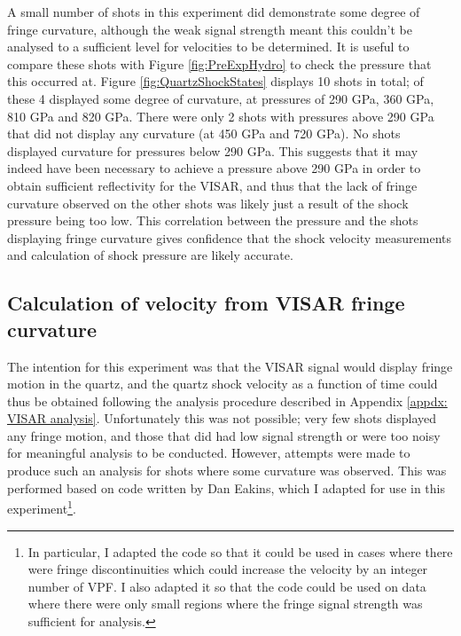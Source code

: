 A small number of shots in this experiment did demonstrate some degree of fringe curvature, although the weak signal strength meant this couldn't be analysed to a sufficient level for velocities to be determined. It is useful to compare these shots with Figure \ref{fig:PreExpHydro} to check the pressure that this occurred at. Figure \ref{fig:QuartzShockStates} displays 10 shots in total; of these 4 displayed some degree of curvature, at pressures of 290 \unit{\giga\pascal}, 360 \unit{\giga\pascal}, 810 \unit{\giga\pascal} and 820 \unit{\giga\pascal}. There were only 2 shots with pressures above 290 \unit{\giga\pascal} that did not display any curvature (at 450 \unit{\giga\pascal} and 720 \unit{\giga\pascal}). No shots displayed curvature for pressures below 290 \unit{\giga\pascal}. This suggests that it may indeed have been necessary to achieve a pressure above 290 \unit{\giga\pascal} in order to obtain sufficient reflectivity for the VISAR, and thus that the lack of fringe curvature observed on the other shots was likely just a result of the shock pressure being too low. This correlation between the pressure and the shots displaying fringe curvature gives confidence that the shock velocity measurements and calculation of shock pressure are likely accurate.

\subsection{Calculation of velocity from VISAR fringe curvature}

The intention for this experiment was that the VISAR signal would display fringe motion in the quartz, and the quartz shock velocity as a function of time could thus be obtained following the analysis procedure described in Appendix \ref{appdx: VISAR analysis}. Unfortunately this was not possible; very few shots displayed any fringe motion, and those that did had low signal strength or were too noisy for meaningful analysis to be conducted. However, attempts were made to produce such an analysis for shots where some curvature was observed. This was performed based on code written by Dan Eakins, which I adapted for use in this experiment\footnote{In particular, I adapted the code so that it could be used in cases where there were fringe discontinuities which could increase the velocity by an integer number of VPF. I also adapted it so that the code could be used on data where there were only small regions where the fringe signal strength was sufficient for analysis.}.

